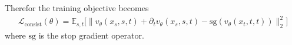 \documentclass{article}
\begin{document}
Therefor the training objective becomes 
\begin{align}
    \mathcal{L}_{\text{consist}}(\theta) = \mathbb{E}_{s,t} \Big[ \Big\| v_{\theta}(x_s, s,t) + \partial_t v_{\theta}(x_s, s,t) - \text{sg}(v_{\theta}(x_t, t,t))\Big\|^2_2 \Big]
\end{align}
where $\text{sg}$ is the stop gradient operator. 


\end{document}
